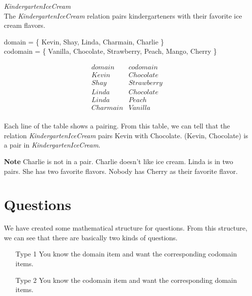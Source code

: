 \documentclass{ximera}
\begin{document}
\begin{example} \textit{KindergartenIceCream} \\
The \textit{KindergartenIceCream} relation pairs kindergarteners with their favorite ice cream flavors.

domain = \{ Kevin, Shay, Linda, Charmain, Charlie \}  \\
codomain = \{ Vanilla, Chocolate, Strawberry, Peach, Mango, Cherry \} 

\[
\begin{array}{l|l}
    domain      & codomain      \\ \hline
    Kevin   &  Chocolate \\
    Shay   & Strawberry \\
    Linda  &  Chocolate \\
    Linda  &  Peach \\
    Charmain &  Vanilla \\ 
\end{array}
\]


Each line of the table shows a pairing. From this table, we can tell that the relation \textit{KindergartenIceCream} pairs Kevin with Chocolate.  (Kevin, Chocolate) is a pair in \textit{KindergartenIceCream}.

\textbf{Note} Charlie is not in a pair.  Charlie doesn't like ice cream. Linda is in two pairs.  She has two favorite flavors.  Nobody has Cherry as their favorite flavor.

\end{example} 





\section{Questions}


We have created some mathematical structure for questions. From this structure, we can see that there are basically two kinds of questions.

\begin{itemize}
\item [Type 1] You know the domain item and want the corresponding codomain items.
\item [Type 2] You know the codomain item and want the corresponding domain items.
\end{itemize}
\end{document}
